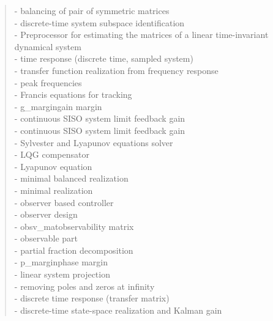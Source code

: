 \begin{quote}
 - {balancing of pair of symmetric matrices} \\  
 - {discrete-time system subspace identification} \\  
 - {Preprocessor for estimating the matrices of a linear time-invariant dynamical system} \\  
 - {time response (discrete time, sampled system)  } \\  
 - {transfer function realization from frequency response} \\  
 - {peak frequencies} \\  
 - {Francis equations for tracking} \\  
 - {g_margin}{gain margin} \\  
 - {continuous SISO system limit feedback gain} \\  
 - {continuous SISO system limit feedback gain} \\  
 - {Sylvester and Lyapunov equations solver} \\  
 - {LQG compensator} \\  
 - {Lyapunov equation} \\  
 - {minimal balanced realization} \\  
 - {minimal realization} \\  
 - {observer based controller} \\  
 - {observer design} \\  
 - {obsv_mat}{observability matrix} \\  
 - {observable part} \\  
 - {partial fraction decomposition} \\  
 - {p_margin}{phase margin} \\  
 - {linear system projection} \\  
 - {removing poles and zeros at infinity} \\  
 - {discrete time response (transfer matrix)  } \\  
 - {discrete-time state-space realization and Kalman gain} \\  

\end{quote}
